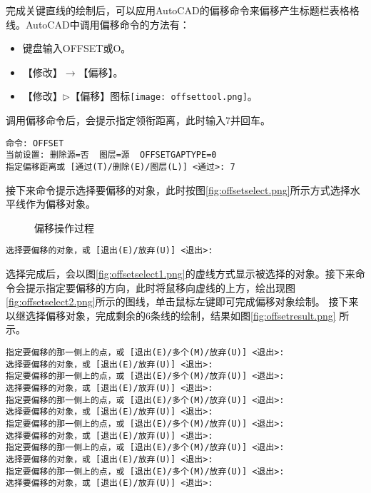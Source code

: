 \begin{procedure}
完成关键直线的绘制后，可以应用AutoCAD的偏移命令来偏移产生标题栏表格格线。AutoCAD中调用偏移命令的方法有：
\begin{itemize}
\item 键盘输入OFFSET或O。
\item 【修改】$\rightarrow$【偏移】。
\item 【修改】$\triangleright$【偏移】图标\texttt{[image: offsettool.png]}。
\end{itemize}
调用偏移命令后，会提示指定领衔距离，此时输入7并回车。
\begin{lstlisting}
命令: OFFSET
当前设置: 删除源=否  图层=源  OFFSETGAPTYPE=0
指定偏移距离或 [通过(T)/删除(E)/图层(L)] <通过>: 7
\end{lstlisting}
接下来命令提示选择要偏移的对象，此时按图\ref{fig:offsetselect.png}所示方式选择水平线作为偏移对象。
\begin{figure}[htbp]
\centering
{}\hspace{20pt}
\hspace{20pt}
\caption{偏移操作过程}
\end{figure}
\begin{lstlisting}
选择要偏移的对象，或 [退出(E)/放弃(U)] <退出>:
\end{lstlisting}
选择完成后，会以图\ref{fig:offsetselect1.png}的虚线方式显示被选择的对象。接下来命令会提示指定要偏移的方向，此时将鼠移向虚线的上方，绘出现图\ref{fig:offsetselect2.png}所示的图线，单击鼠标左键即可完成偏移对象绘制。
接下来以继选择偏移对象，完成剩余的6条线的绘制，结果如图\ref{fig:offsetresult.png} 所示。
\begin{lstlisting}
指定要偏移的那一侧上的点，或 [退出(E)/多个(M)/放弃(U)] <退出>:
选择要偏移的对象，或 [退出(E)/放弃(U)] <退出>:
指定要偏移的那一侧上的点，或 [退出(E)/多个(M)/放弃(U)] <退出>:
选择要偏移的对象，或 [退出(E)/放弃(U)] <退出>:
指定要偏移的那一侧上的点，或 [退出(E)/多个(M)/放弃(U)] <退出>:
选择要偏移的对象，或 [退出(E)/放弃(U)] <退出>:
指定要偏移的那一侧上的点，或 [退出(E)/多个(M)/放弃(U)] <退出>:
选择要偏移的对象，或 [退出(E)/放弃(U)] <退出>:
指定要偏移的那一侧上的点，或 [退出(E)/多个(M)/放弃(U)] <退出>:
选择要偏移的对象，或 [退出(E)/放弃(U)] <退出>:
指定要偏移的那一侧上的点，或 [退出(E)/多个(M)/放弃(U)] <退出>:
选择要偏移的对象，或 [退出(E)/放弃(U)] <退出>:
\end{lstlisting}


\end{procedure}
